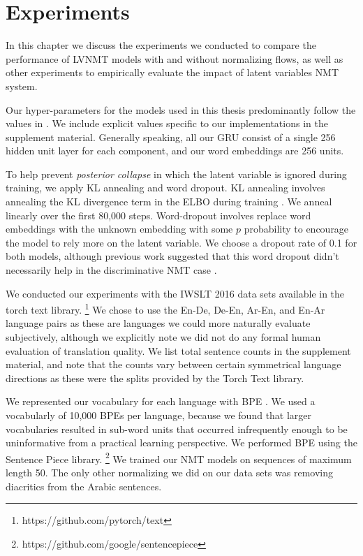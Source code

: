 \chapter{Experiments}

In this chapter we discuss the experiments we conducted to compare the performance of \ac{LVNMT} models with and without normalizing flows, as well as other experiments to empirically evaluate the impact of latent variables \ac{NMT} system.  

Our hyper-parameters for the models used in this thesis predominantly follow the values in \cite{eikema2018AEVNMT}. We include explicit values specific to our implementations in the supplement material. Generally speaking, all our \ac{GRU} consist of a single 256 hidden unit layer for each component, and our word embeddings are 256 units.

To help prevent \textit{posterior collapse} in which the latent variable is ignored during training, we apply KL annealing and word dropout. KL annealing involves annealing the KL divergence term in the \ac{ELBO} during training \cite{bowman2015GeneratingSent}. We anneal  linearly over the first 80,000 steps. Word-dropout involves replace word embeddings with the unknown embedding with some $p$ probability to encourage the model to rely more on the latent variable. We choose a dropout rate of 0.1 for both models, although previous work suggested that this word dropout didn't necessarily help in the discriminative \ac{NMT} case \cite{harshil2018GNMT}. 

We conducted our experiments with the IWSLT 2016 data sets available in the torch text library. \footnote{https://github.com/pytorch/text} We chose to use the En-De, De-En, Ar-En, and En-Ar language pairs as these are languages we could more naturally evaluate subjectively, although we explicitly note we did not do any formal human evaluation of translation quality. We list total sentence counts in the supplement material, and note that the counts vary between certain symmetrical language directions as these were the splits provided by the Torch Text library. 

We represented our vocabulary for each language with \ac{BPE} \cite{sennrich2015NMTRarwordsBPE}. We used a vocabularly of 10,000 \ac{BPE}s per language, because we found that larger vocabularies resulted in sub-word units that occurred infrequently enough to be uninformative from a practical learning perspective. We performed \ac{BPE} using the Sentence Piece library. \footnote{https://github.com/google/sentencepiece} We trained our \ac{NMT} models on sequences of maximum length 50. The only other normalizing we did on our data sets was removing diacritics from the Arabic sentences. 

